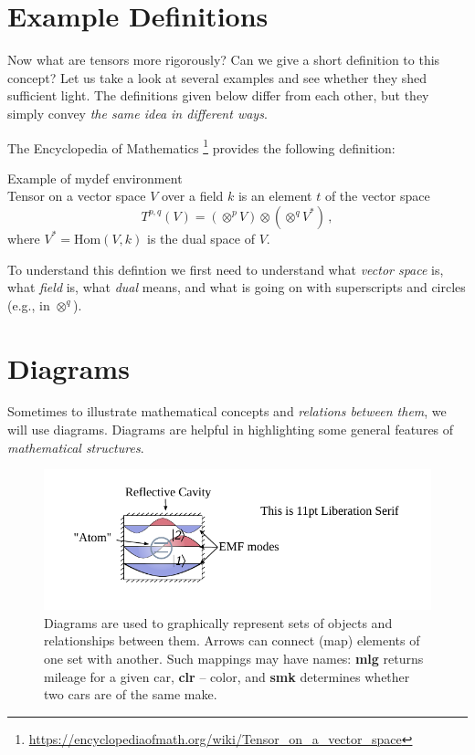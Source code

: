 \section{Example Definitions}\label{sec:ExampleDefinitions}
Now what are tensors more rigorously? Can we give a short definition
to this concept?
Let us take a look at several examples and see whether they shed
sufficient light. The definitions given below differ from each other,
but they simply convey \emph{the same idea in different ways}.

The Encyclopedia of Mathematics
\footnote{\url{https://encyclopediaofmath.org/wiki/Tensor_on_a_vector_space}}
provides the following definition:

\begin{mydef}{Example of mydef environment}\\
  \small
Tensor on a vector space $V$ over a field $k$ is an element $t$ of the
vector space
\begin{equation*}
	T^{p,q} (V) = (\otimes^p V)\otimes (\otimes^q V^*)\,,
\end{equation*}
where $V^*=\textrm{Hom}(V, k)$ is the dual space of $V$.
\label{tcb:tensorDefinition1}
\end{mydef}
To understand this defintion we first need to understand what
\emph{vector space} is, what \emph{field} is, what \emph{dual} means,
and what is going on with superscripts and circles (e.g., in
$\otimes^q$).


\section{Diagrams}
Sometimes to illustrate mathematical concepts and \emph{relations between them},
we will use diagrams. Diagrams are helpful in highlighting
some general features of \emph{mathematical structures}.

\begin{figure}[htbp]
  \centering
  \includegraphics[scale=1.0]{defaultFigureTemplate}
  \caption{Diagrams are used to graphically represent sets of objects
    and relationships between them. Arrows can connect (map) elements
    of one set with another. Such mappings may have names: {\bf mlg}
    returns mileage for a given car, {\bf clr} -- color, and {\bf smk}
  determines whether two cars are of the same make.}
  \label{fig:diagrams}
\end{figure}

